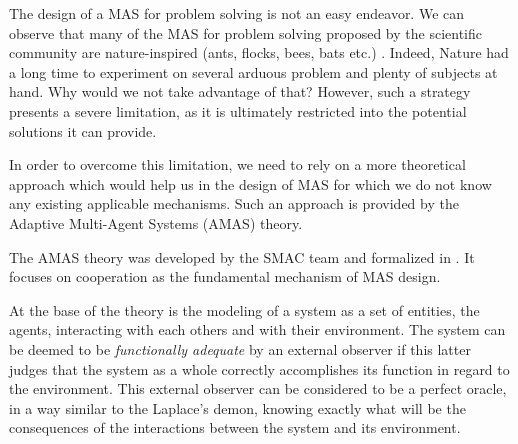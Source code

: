 The design of a MAS for problem solving is not an easy endeavor. We can observe that many of the MAS for problem solving proposed by the scientific community are nature-inspired (ants, flocks, bees, bats etc.) \cite{di2011self}. Indeed, Nature had a long time to experiment on several arduous problem and plenty of subjects at hand. Why would we not take advantage of that? However, such a strategy presents a severe limitation, as it is ultimately restricted into the potential solutions it can provide.

In order to overcome this limitation, we need to rely on a more theoretical approach which would help us in the design of MAS for which we do not know any existing applicable mechanisms. Such an approach is provided by the Adaptive Multi-Agent Systems (AMAS) theory.

The AMAS theory was developed by the SMAC team and formalized in \cite{glize2001adaptation}. It focuses on cooperation as the fundamental mechanism of MAS design.


At the base of the theory is the modeling of a system as a set of entities, the agents, interacting with each others and with their environment. The system can be deemed to be \emph{functionally adequate} by an external observer if this latter judges that the system as a whole correctly accomplishes its function in regard to the environment. This external observer can be considered to be a perfect oracle, in a way similar to the Laplace's demon, knowing exactly what will be the consequences of the interactions between the system and its environment.

